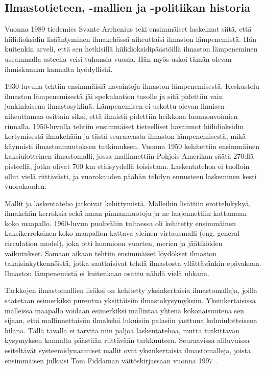 \documentclass[finnish,12pt,a4paper,pdftex]{article}
\begin{document}
\begin{onehalfspacing}
\subsection{Ilmastotieteen, -mallien ja -politiikan historia \label{ilmasto:historia}}

Vuonna 1989 tiedemies Svante Arrhenius teki ensimmäiset laskelmat siitä, että hiilidioksidin lisääntyminen ilmakehässä aiheuttaisi ilmaston lämpenemistä. Hän kuitenkin arveli, että sen hetkisillä hiilidioksidipäästöillä ilmaston lämpeneminen useammalla asteella veisi tuhansia vuosia. Hän myös uskoi tämän olevan ihmiskunnan kannalta hyödyllistä. \cite{AmericanInstituteofPhysicsSimple}

1930-luvulla tehtiin ensimmäisiä havaintoja ilmaston lämpenemisestä. Keskustelu ilmaston lämpenemisestä jäi spekulaation tasolle ja sitä pidettiin vain jonkinlaisena ilmastosyklinä. Lämpenemisen ei uskottu olevan ihmisen aiheuttamaa osittain siksi, että ihmistä pidettiin heikkona luonnonvoimien rinnalla. 1950-luvulla tehtiin ensimmäiset tieteelliset havainnot hiilidioksidin kertymisestä ilmakehään ja tästä seuraavasta ilmaston lämpenemisestä, mikä käynnisti ilmastonmuutoksen tutkimuksen. \cite{AmericanInstituteofPhysics} Vuonna 1950 kehitettiin ensimmäinen kaksiulotteinen ilmastomalli, jossa mallinnettiin Pohjois-Amerikan säätä 270:llä pisteellä, jotka olivat 700 km etäisyydellä toisistaan. Laskentatehoa ei tuolloin ollut vielä riittävästi, ja vuorokauden päähän tehdyn ennusteen laskeminen kesti vuorokauden. \cite{AmericanInstituteofPhysicsGCM}

Mallit ja laskentateho jatkoivat kehittymistä. Malleihin lisättiin erottelukykyä, ilmakehän kerroksia sekä maan pinnanmuotoja ja ne laajennettiin kattamaan koko maapallo. 1960-luvun puoliväliin tultaessa oli kehitetty ensimmäinen kaksikerroksinen koko maapallon kattava yleinen virtausmalli (eng. general circulation model), joka otti huomioon vuorten, merien ja jäätiköiden vaikutukset. \cite{AmericanInstituteofPhysicsGCM} Samaan aikaan tehtiin ensimmäiset löydökset ilmaston takaisinkytkennöistä, jotka saattaisivat tehdä ilmastosta yllättävänkin epävakaan. Ilmaston lämpenemistä ei kuitenkaan osattu nähdä vielä uhkana. \cite{AmericanInstituteofPhysics} 

Tarkkojen ilmastomallien lisäksi on kehitetty yksinkertaisia ilmastomalleja, joilla saatetaan esimerkiksi pureutua yksittäisiin ilmastokysymyksiin. Yksinkertaisissa malleissa maapallo voidaan esimerkiksi mallintaa yhtenä kokonaisuutena sen sijaan, että mallinnettaisiin ilmakehä lukuisiin palasiin jaettuna kolmiulotteisena hilana. Tällä tavalla ei tarvita niin paljoa laskentatehoa, mutta tutkittavan kysymyksen kannalta päästään riittävään tarkkuuteen. \cite{AmericanInstituteofPhysicsSimple} Seuraavissa aliluvuissa esiteltävät systeemidynaamiset mallit ovat yksinkertaisia ilmastomalleja, joista ensimmäisen julkaisi Tom Fiddaman väitöskirjassaan vuonna 1997 \cite{Fiddaman1997}. 


\end{onehalfspacing}
\end{document}
